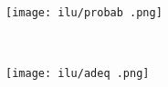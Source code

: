 \begin{figure}[H]\begin{center}\texttt{[image: ilu/probab .png]}\end{center}\end{figure}


\begin{lstlisting}[language=html]
  
\end{lstlisting}


















\begin{figure}[H]\begin{center}\texttt{[image: ilu/adeq .png]}\end{center}\end{figure}



